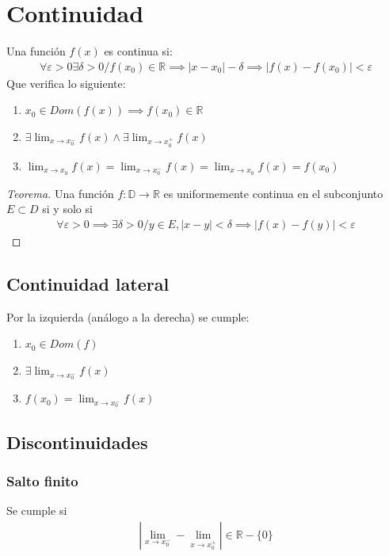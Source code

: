 \documentclass{article}
\begin{document}
\section{Continuidad}
Una función $f(x)$ es continua si:
\begin{equation}
    \begin{split}
        \forall \varepsilon > 0 \exists \delta > 0 / f(x_{0}) \in \mathbb{R} \implies 
        |x-x_{0}|-\delta  \implies |f(x)-f(x_{0})|<\varepsilon
    \end{split}
\end{equation}
Que verifica lo siguiente:
\begin{enumerate}
    \item $x_{0} \in Dom(f(x)) \implies f(x_{0}) \in \mathbb{R}$
    \item $\exists \lim_{x \to x_{0}^-} f(x) \wedge \exists \lim_{x \to x_{0}^+}f(x)$
    \item $\lim_{x \to x_{0}} f(x)=\lim_{x \to x_{0}^-} f(x)=\lim_{x \to x_{0}} f(x)=f(x_{0})$
\end{enumerate}
\begin{proof}[Teorema]
    Una función $f:\mathbb{D} \to \mathbb{R}$ es uniformemente continua en el subconjunto
    $E \subset D$ si y solo si
    \begin{equation}
        \begin{split}
            \forall \varepsilon > 0 \implies \exists \delta >0 / y \in E,
            |x-y|<\delta  \implies |f(x)-f(y)|<\varepsilon
        \end{split}
    \end{equation}
\end{proof}
\subsection{Continuidad lateral}
Por la izquierda (análogo a la derecha) se cumple:
\begin{enumerate}
    \item $x_{0} \in Dom(f)$
    \item $\exists \lim_{x \to x_{0}^{-}} f(x)$
    \item $f(x_{0})=\lim_{x \to x_{0}^{-}} f(x)$
\end{enumerate}
\subsection{Discontinuidades}
\subsubsection{Salto finito}
Se cumple si
\begin{equation}
    \begin{split}
        |\lim_{x \to x_{0}^{-}}-\lim_{x \to x_{0}^{+}}| \in \mathbb{R} -\{ 0 \}
    \end{split}
\end{equation}
\end{document}
